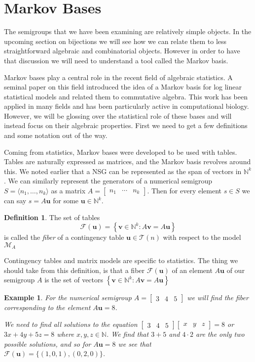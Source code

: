 \documentclass[11pt]{amsart}
\theoremstyle{plain}
\newtheorem{exa}{Example}
\theoremstyle{definition}
\newtheorem{defi}{Definition}
\begin{document}
\section{Markov Bases}
The semigroups that we have been examining are relatively simple objects. In the upcoming section on bijections we will see how we can relate them to less straightforward algebraic and combinatorial objects. However in order to have that discussion we will need to understand a tool called the Markov basis.

Markov bases play a central role in the recent field of algebraic statistics.
A seminal paper\cite{markstats} on this field introduced the idea of a
Markov basis for log linear statistical models and related them
to commutative algebra. This work has been applied in many fields and has been
particularly active in computational biology\cite{bernd}. However, we will be glossing over
the statistical role of these bases and will instead focus on their algebraic
properties. First we need to get a few definitions and some notation out of the
way.

Coming from statistics, Markov bases were developed to be used with tables.
Tables are naturally expressed as matrices, and the Markov basis
revolves around this. We noted earlier that a NSG can be represented as the
span of vectors in $\mathbb{N}^k$. We can similarly represent the generators of a numerical semigroup $S=\langle n_1,\dots,n_k \rangle$ as a
matrix $A=\left[\begin{array}{rrr}n_1&\cdots&n_k\end{array}\right]$. Then for
every element $s\in S$ we can say $s=A\mathbf{u}$ for some $\mathbf{u}\in \mathbb{N}^k$.

\begin{defi}
  \cite{bernd}
  The set of tables
  \[\mathcal{F}(\mathbf{u})=\left\{\mathbf{v}\in \mathbb{N}^k:A\mathbf{v}=A\mathbf{u}\right\}\]
  is called the \emph{fiber} of a contingency table $\mathbf{u}\in \mathcal{T}(n)$ with
  respect to the model $\mathcal{M}_A$
\end{defi}

Contingency tables and matrix models are specific to statistics. The thing we
should take from this definition, is that a fiber $\mathcal{F}(\mathbf{u})$ of an element
$A\mathbf{u}$ of our semigroup $A$ is the set of vectors $\left\{\mathbf{v}\in \mathbb{N}^k:A\mathbf{v}=A\mathbf{u}
\right\}$
\begin{exa}
  For the numerical semigroup $A=\left[\begin{array}{rrr}3&4&5\end{array}\right]$
  we will find the fiber corresponding to the element $A\mathbf{u}=8$.

  We need to find all solutions to the equation $\left[\begin{array}{rrr}3&4&5
\end{array}\right]\left[\begin{array}{rrr}x&y&z \end{array}\right]=8$ or
$3x+4y+5z=8$ where $x,y,z\in \mathbb{N}$. We find that $3+5$ and $4\cdot 2$ are
the only two possible solutions, and so for $A\mathbf{u}=8$ we see that $\mathcal{F}(\mathbf{u})=
\{(1,0,1),(0,2,0)\}$.
\end{exa}
\end{document}
